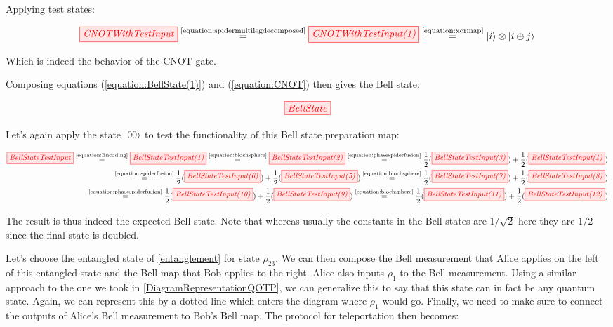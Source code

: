 \documentclass[]{article}
\newcommand{\equaltext}[1]{\ensuremath{\stackrel{\text{#1}}{=}}}
\begin{document}
Applying test states:

\begin{equation}
	\tikzfig{CNOTWithTestInput} \equaltext{\ref{equation:spidermultilegdecomposed}} \tikzfig{CNOTWithTestInput(1)} \equaltext{\ref{equation:xormap}} \ket{i} \otimes \ket{i \oplus j}
\end{equation}

Which is indeed the behavior of the CNOT gate.

Composing equations (\ref{equation:BellState(1)}) and (\ref{equation:CNOT}) then gives the Bell state:

\begin{equation}
	\tikzfig{BellState}
\end{equation}

Let's again apply the state $\ket{00}$ to test the functionality of this Bell state preparation map:

\begin{equation}
\label{BellStateTestInput}
	\begin{split}
	\tikzfig{BellStateTestInput} \equaltext{\ref{equation:Encoding}} \tikzfig{BellStateTestInput(1)} \equaltext{\ref{equation:blochsphere}} \tikzfig{BellStateTestInput(2)} \equaltext{\ref{equation:phasespiderfusion}}
	 \frac{1}{2}(\tikzfig{BellStateTestInput(3)})+
	\frac{1}{2}(\tikzfig{BellStateTestInput(4)}) 
 \\ \equaltext{\ref{equation:spiderfusion}}
 	\frac{1}{2}(\tikzfig{BellStateTestInput(6)}) +
  \frac{1}{2}(\tikzfig{BellStateTestInput(5)}) 
	\equaltext{\ref{equation:blochsphere}} \frac{1}{2}(\tikzfig{BellStateTestInput(7)}) + \frac{1}{2}(\tikzfig{BellStateTestInput(8)}) \\ \equaltext{\ref{equation:phasespiderfusion}}
	\frac{1}{2}(\tikzfig{BellStateTestInput(10)}) +
	 \frac{1}{2}(\tikzfig{BellStateTestInput(9)}) 
	 \equaltext{\ref{equation:blochsphere}} \frac{1}{2}(\tikzfig{BellStateTestInput(11)}) +
	\frac{1}{2}(\tikzfig{BellStateTestInput(12)})
	\end{split}
\end{equation}

The result is thus indeed the expected Bell state. Note that whereas usually the constants in the Bell states are $1/\sqrt{2}$ here they are $1/2$ since the final state is doubled.

Let's choose the entangled state of \ref{entanglement} for state $\rho_{23}$. We can then compose the Bell measurement that Alice applies on the left of this entangled state and the Bell map that Bob applies to the right. Alice also inputs $\rho_1$ to the Bell measurement. Using a similar approach to the one we took in \ref{DiagramRepresentationQOTP}, we can generalize this to say that this state can in fact be any quantum state. Again, we can represent this by a dotted line which enters the diagram where $\rho_1$ would go. Finally, we need to make sure to connect the outputs of Alice's Bell measurement to Bob's Bell map. The protocol for teleportation then becomes: 
 
\end{document}
